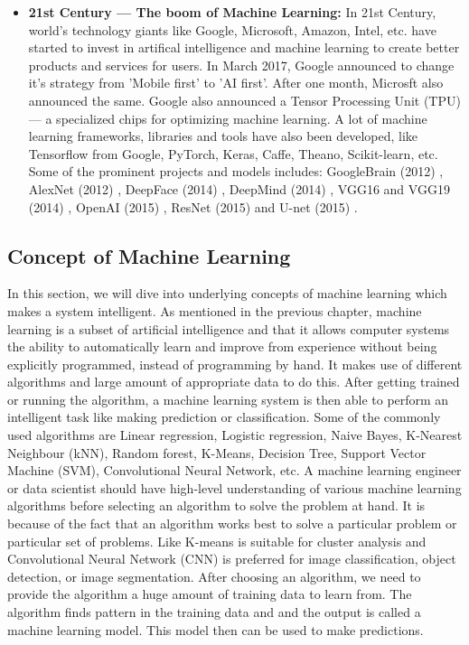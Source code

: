 \begin{itemize}
  \item  \textbf{21st Century — The boom of Machine Learning:} In 21st Century, world's technology giants like Google, Microsoft, Amazon, Intel, etc. have started to invest in artifical intelligence and machine learning to create better products and services for users. In March 2017, Google announced to change it's strategy from 'Mobile first' to 'AI first'. After one month, Microsft also announced the same. Google also announced a Tensor Processing Unit (TPU) — a specialized chips for optimizing machine learning. A lot of machine learning frameworks, libraries and tools have also been developed, like Tensorflow from Google, PyTorch, Keras, Caffe, Theano, Scikit-learn, etc. Some of the prominent projects and models includes: GoogleBrain (2012) \cite{googlebrain}, AlexNet (2012) \cite{alexnet}, DeepFace (2014) \cite{deepface}, DeepMind (2014) \cite{deepmind}, VGG16 and VGG19  (2014) \cite{vgg_19}, OpenAI (2015) \cite{openai}, ResNet (2015) \cite{resnet} and U-net (2015) \cite{unet}.
\end{itemize}

\subsection{Concept of Machine Learning}
In this section, we will dive into underlying concepts of machine learning which makes a system intelligent. As mentioned in the previous chapter, machine learning is a subset of artificial intelligence and that it allows computer systems the ability to automatically learn and improve from experience without being explicitly programmed, instead of programming by hand. It makes use of different algorithms and large amount of appropriate data to do this. After getting trained or running the algorithm, a machine learning system is then able to perform an intelligent task like making prediction or classification. Some of the commonly used algorithms are Linear regression, Logistic regression, Naive Bayes, K-Nearest Neighbour (kNN), Random forest, K-Means, Decision Tree, Support Vector Machine (SVM), Convolutional Neural Network, etc. A machine learning engineer or data scientist should have high-level understanding of various machine learning algorithms before selecting an algorithm to solve the problem at hand. It is because of the fact that an algorithm works best to solve a particular problem or particular set of problems. Like K-means is suitable for cluster analysis and Convolutional Neural Network (CNN) is preferred for image classification, object detection, or image segmentation. After choosing an algorithm, we need to provide the algorithm a huge amount of training data to learn from. The algorithm finds pattern in the training data and and the output is called a machine learning model. This model then can be used to make predictions.

